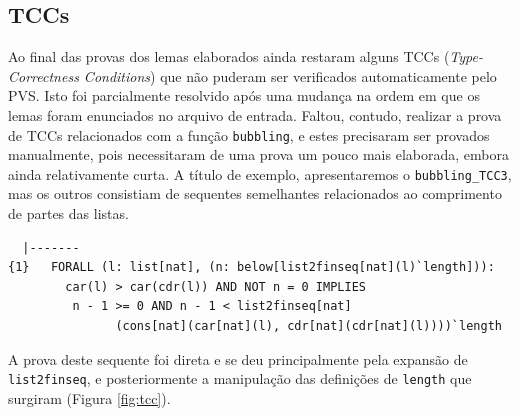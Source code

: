 \subsection{TCCs}

Ao final das provas dos lemas elaborados ainda restaram alguns TCCs 
(\textit{Type-Correctness Conditions}) que não puderam ser verificados
automaticamente pelo PVS. Isto foi parcialmente resolvido após uma mudança
na ordem em que os lemas foram enunciados no arquivo de entrada.
Faltou, contudo, realizar a prova de TCCs relacionados com a função
\texttt{bubbling}, e estes precisaram ser provados manualmente, pois necessitaram
de uma prova um pouco mais elaborada, embora ainda relativamente curta. A título
de exemplo, apresentaremos o \texttt{bubbling\_TCC3}, mas os
outros consistiam de sequentes semelhantes relacionados ao comprimento
de partes das listas.
\begin{lstlisting}
  |-------
{1}   FORALL (l: list[nat], (n: below[list2finseq[nat](l)`length])):
        car(l) > car(cdr(l)) AND NOT n = 0 IMPLIES
         n - 1 >= 0 AND n - 1 < list2finseq[nat]
               (cons[nat](car[nat](l), cdr[nat](cdr[nat](l))))`length
\end{lstlisting}

A prova deste sequente foi direta e se deu principalmente pela expansão
de \texttt{list2finseq}, e posteriormente a manipulação das definições
de \texttt{length} que surgiram (Figura \ref{fig:tcc}).


